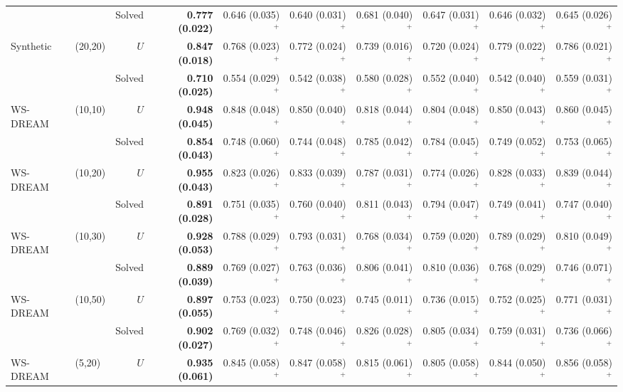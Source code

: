 \begin{tabular}{llrrrrrrrr}
 &  & Solved & \textbf{0.777 (0.022)} & 0.646 (0.035)$^{+}$ & 0.640 (0.031)$^{+}$ & 0.681 (0.040)$^{+}$ & 0.647 (0.031)$^{+}$ & 0.646 (0.032)$^{+}$ & 0.645 (0.026)$^{+}$\\
Synthetic & (20,20) & $U$ & \textbf{0.847 (0.018)} & 0.768 (0.023)$^{+}$ & 0.772 (0.024)$^{+}$ & 0.739 (0.016)$^{+}$ & 0.720 (0.024)$^{+}$ & 0.779 (0.022)$^{+}$ & 0.786 (0.021)$^{+}$\\
 &  & Solved & \textbf{0.710 (0.025)} & 0.554 (0.029)$^{+}$ & 0.542 (0.038)$^{+}$ & 0.580 (0.028)$^{+}$ & 0.552 (0.040)$^{+}$ & 0.542 (0.040)$^{+}$ & 0.559 (0.031)$^{+}$\\
\midrule
WS-DREAM & (10,10) & $U$ & \textbf{0.948 (0.045)} & 0.848 (0.048)$^{+}$ & 0.850 (0.040)$^{+}$ & 0.818 (0.044)$^{+}$ & 0.804 (0.048)$^{+}$ & 0.850 (0.043)$^{+}$ & 0.860 (0.045)$^{+}$\\
 &  & Solved & \textbf{0.854 (0.043)} & 0.748 (0.060)$^{+}$ & 0.744 (0.048)$^{+}$ & 0.785 (0.042)$^{+}$ & 0.784 (0.045)$^{+}$ & 0.749 (0.052)$^{+}$ & 0.753 (0.065)$^{+}$\\
WS-DREAM & (10,20) & $U$ & \textbf{0.955 (0.043)} & 0.823 (0.026)$^{+}$ & 0.833 (0.039)$^{+}$ & 0.787 (0.031)$^{+}$ & 0.774 (0.026)$^{+}$ & 0.828 (0.033)$^{+}$ & 0.839 (0.044)$^{+}$\\
 &  & Solved & \textbf{0.891 (0.028)} & 0.751 (0.035)$^{+}$ & 0.760 (0.040)$^{+}$ & 0.811 (0.043)$^{+}$ & 0.794 (0.047)$^{+}$ & 0.749 (0.041)$^{+}$ & 0.747 (0.040)$^{+}$\\
WS-DREAM & (10,30) & $U$ & \textbf{0.928 (0.053)} & 0.788 (0.029)$^{+}$ & 0.793 (0.031)$^{+}$ & 0.768 (0.034)$^{+}$ & 0.759 (0.020)$^{+}$ & 0.789 (0.029)$^{+}$ & 0.810 (0.049)$^{+}$\\
 &  & Solved & \textbf{0.889 (0.039)} & 0.769 (0.027)$^{+}$ & 0.763 (0.036)$^{+}$ & 0.806 (0.041)$^{+}$ & 0.810 (0.036)$^{+}$ & 0.768 (0.029)$^{+}$ & 0.746 (0.071)$^{+}$\\
WS-DREAM & (10,50) & $U$ & \textbf{0.897 (0.055)} & 0.753 (0.023)$^{+}$ & 0.750 (0.023)$^{+}$ & 0.745 (0.011)$^{+}$ & 0.736 (0.015)$^{+}$ & 0.752 (0.025)$^{+}$ & 0.771 (0.031)$^{+}$\\
 &  & Solved & \textbf{0.902 (0.027)} & 0.769 (0.032)$^{+}$ & 0.748 (0.046)$^{+}$ & 0.826 (0.028)$^{+}$ & 0.805 (0.034)$^{+}$ & 0.759 (0.031)$^{+}$ & 0.736 (0.066)$^{+}$\\
WS-DREAM & (5,20) & $U$ & \textbf{0.935 (0.061)} & 0.845 (0.058)$^{+}$ & 0.847 (0.058)$^{+}$ & 0.815 (0.061)$^{+}$ & 0.805 (0.058)$^{+}$ & 0.844 (0.050)$^{+}$ & 0.856 (0.058)$^{+}$\\

\end{tabular}
